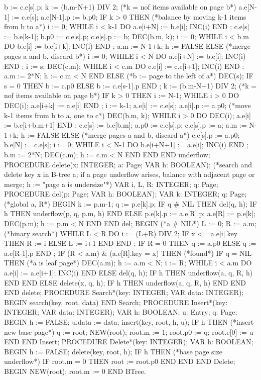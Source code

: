 b := c.e[s].p; k := (b.m-N+1) DIV 2; (*k = nof items available on page b*) a.e[N-1] := c.e[s]; a.e[N-1].p := b.p0;
IF k > 0 THEN (*balance by moving k-1 items from b to a*) i := 0;
WHILE i < k-1 DO a.e[i+N] := b.e[i]; INC(i) END ; c.e[s] := b.e[k-1]; b.p0 := c.e[s].p;
c.e[s].p := b; DEC(b.m, k); i := 0;
WHILE i < b.m DO b.e[i] := b.e[i+k]; INC(i) END ; a.m := N-1+k; h := FALSE
ELSE (*merge pages a and b, discard b*) i := 0; WHILE i < N DO a.e[i+N] := b.e[i]; INC(i) END ;
i := s; DEC(c.m);
WHILE i < c.m DO c.e[i] := c.e[i+1]; INC(i) END ; a.m := 2*N; h := c.m < N
END
ELSE (*b := page to the left of a*) DEC(s);
IF s = 0 THEN b := c.p0 ELSE b := c.e[s-1].p END ;
k := (b.m-N+1) DIV 2; (*k = nof items available on page b*) IF k > 0 THEN i := N-1;
WHILE i > 0 DO DEC(i); a.e[i+k] := a.e[i] END ;
i := k-1; a.e[i] := c.e[s]; a.e[i].p := a.p0;
(*move k-1 items from b to a, one to c*) DEC(b.m, k); WHILE i > 0 DO DEC(i); a.e[i] := b.e[i+b.m+1] END ; c.e[s] := b.e[b.m]; a.p0 := c.e[s].p;
c.e[s].p := a; a.m := N-1+k; h := FALSE ELSE (*merge pages a and b, discard a*)
c.e[s].p := a.p0; b.e[N] := c.e[s]; i := 0;
WHILE i < N-1 DO b.e[i+N+1] := a.e[i]; INC(i) END ; b.m := 2*N; DEC(c.m); h := c.m < N
END END
END underflow;
PROCEDURE delete(x: INTEGER; a: Page; VAR h: BOOLEAN); (*search and delete key x in B-tree a; if a page underflow arises,
balance with adjacent page or merge; h := "page a is undersize"*) VAR i, L, R: INTEGER; q: Page;
PROCEDURE del(p: Page; VAR h: BOOLEAN); VAR k: INTEGER; q: Page; (*global a, R*)
BEGIN k := p.m-1; q := p.e[k].p; IF q # NIL THEN del(q, h);
IF h THEN underflow(p, q, p.m, h) END ELSE p.e[k].p := a.e[R].p; a.e[R] := p.e[k];
DEC(p.m); h := p.m < N END
END del;
BEGIN (*a # NIL*)
L := 0; R := a.m; (*binary search*) WHILE L < R DO
i := (L+R) DIV 2;
IF x <= a.e[i].key THEN R := i ELSE L := i+1 END END ;
IF R = 0 THEN q := a.p0 ELSE q := a.e[R-1].p END ; IF (R < a.m) & (a.e[R].key = x) THEN (*found*)
IF q = NIL THEN (*a is leaf page*)
DEC(a.m); h := a.m < N; i := R;
WHILE i < a.m DO a.e[i] := a.e[i+1]; INC(i) END
ELSE del(q, h);
IF h THEN underflow(a, q, R, h) END
END
ELSE delete(x, q, h);
IF h THEN underflow(a, q, R, h) END END
END delete;
PROCEDURE Search*(key: INTEGER; VAR data: INTEGER); BEGIN search(key, root, data)
END Search;
PROCEDURE Insert*(key: INTEGER; VAR data: INTEGER); VAR h: BOOLEAN; u: Entry; q: Page;
BEGIN h := FALSE; u.data := data; insert(key, root, h, u); IF h THEN (*insert new base page*)
q := root; NEW(root);
root.m := 1; root.p0 := q; root.e[0] := u END
END Insert;
PROCEDURE Delete*(key: INTEGER); VAR h: BOOLEAN;
BEGIN h := FALSE; delete(key, root, h); IF h THEN (*base page size underflow*)
IF root.m = 0 THEN root := root.p0 END END
END Delete;
BEGIN NEW(root); root.m := 0 END BTree.
\endtt

